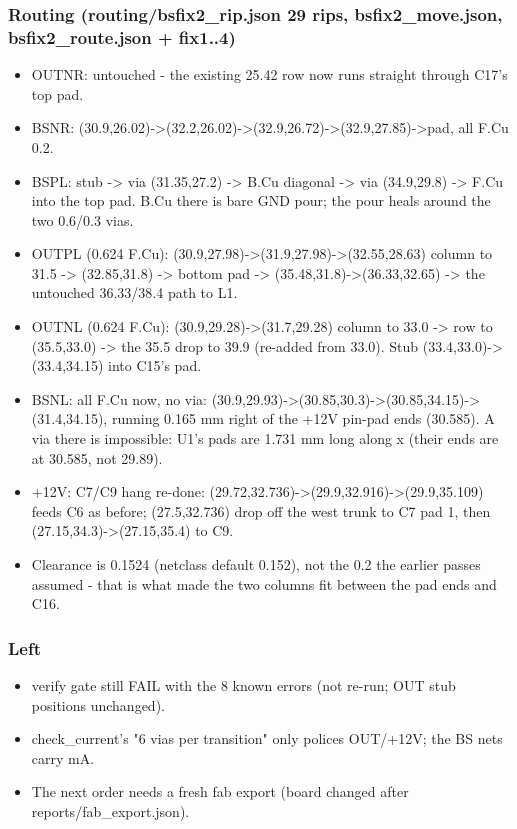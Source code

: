 \documentclass[11pt]{article}
\begin{document}
\subsubsection*{Routing (routing/bsfix2\_rip.json 29 rips, bsfix2\_move.json, bsfix2\_route.json + fix1..4)}
\begin{itemize}
\item OUTNR: untouched - the existing 25.42 row now runs straight through C17's top pad.
\item BSNR: (30.9,26.02)-\textgreater{}(32.2,26.02)-\textgreater{}(32.9,26.72)-\textgreater{}(32.9,27.85)-\textgreater{}pad, all F.Cu 0.2.
\item BSPL: stub -\textgreater{} via (31.35,27.2) -\textgreater{} B.Cu diagonal -\textgreater{} via (34.9,29.8) -\textgreater{} F.Cu into the top pad.
B.Cu there is bare GND pour; the pour heals around the two 0.6/0.3 vias.
\item OUTPL (0.624 F.Cu): (30.9,27.98)-\textgreater{}(31.9,27.98)-\textgreater{}(32.55,28.63) column to 31.5 -\textgreater{} (32.85,31.8)
-\textgreater{} bottom pad -\textgreater{} (35.48,31.8)-\textgreater{}(36.33,32.65) -\textgreater{} the untouched 36.33/38.4 path to L1.
\item OUTNL (0.624 F.Cu): (30.9,29.28)-\textgreater{}(31.7,29.28) column to 33.0 -\textgreater{} row to (35.5,33.0) -\textgreater{} the
35.5 drop to 39.9 (re-added from 33.0). Stub (33.4,33.0)-\textgreater{}(33.4,34.15) into C15's pad.
\item BSNL: all F.Cu now, no via: (30.9,29.93)-\textgreater{}(30.85,30.3)-\textgreater{}(30.85,34.15)-\textgreater{}(31.4,34.15), running
0.165 mm right of the +12V pin-pad ends (30.585). A via there is impossible: U1's pads are
1.731 mm long along x (their ends are at 30.585, not 29.89).
\item +12V: C7/C9 hang re-done: (29.72,32.736)-\textgreater{}(29.9,32.916)-\textgreater{}(29.9,35.109) feeds C6 as before;
(27.5,32.736) drop off the west trunk to C7 pad 1, then (27.15,34.3)-\textgreater{}(27.15,35.4) to C9.
\item Clearance is 0.1524 (netclass default 0.152), not the 0.2 the earlier passes assumed - that
is what made the two columns fit between the pad ends and C16.
\end{itemize}
\subsubsection*{Left}
\begin{itemize}
\item verify gate still FAIL with the 8 known errors (not re-run; OUT stub positions unchanged).
\item check\_current's "6 vias per transition" only polices OUT/+12V; the BS nets carry mA.
\item The next order needs a fresh fab export (board changed after reports/fab\_export.json).
\end{itemize}
\end{document}

